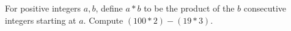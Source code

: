 For positive integers $a,b$, define $a*b$ to be the product of the $b$ consecutive integers starting at $a$. Compute $(100*2)-(19*3)$.
